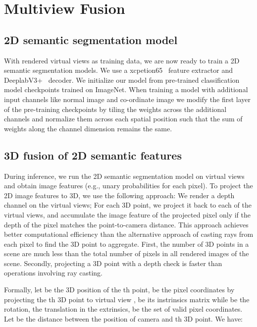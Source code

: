 \documentclass[runningheads]{llncs}
\begin{document}
\section{Multiview Fusion}\label{sec:fusion}

\subsection{2D semantic segmentation model}

With rendered virtual views as training data, we are now ready to train a 2D semantic segmentation models. We use a xcpetion65~\cite{chollet2017xception} feature extractor and DeeplabV3+~\cite{deeplabv3plus2018} decoder. We initialize our model from pre-trained classification model checkpoints trained on ImageNet. When training a model with additional input channels like normal image and co-ordinate image we modify the first layer of the pre-training checkpoints by tiling the weights across the additional channels and normalize them across each spatial position such that the sum of weights along the channel dimension remains the same.

\subsection{3D fusion of 2D semantic features}

During inference, we run the 2D semantic segmentation model on virtual views and obtain image features (e.g., unary probabilities for each pixel). To project the 2D image features to 3D, we use the following approach: We render a depth channel on the virtual views; For each 3D point, we project it back to each of the virtual views, and accumulate the image feature of the projected pixel only if the depth of the pixel matches the point-to-camera distance. This approach achieves better computational efficiency than the alternative approach of casting rays from each pixel to find the 3D point to aggregate. First, the number of 3D points in a scene are much less than the total number of pixels in all rendered images of the scene. Secondly, projecting a 3D point with a depth check is faster than operations involving ray casting.

Formally, let  be the 3D position of the th point,  be the pixel coordinates by projecting the th 3D point to virtual view ,  be its instrinsics matrix while  be the rotation,  the translation in the extrinsics,  be the set of valid pixel coordinates.  Let  be the distance between the position of camera  and th 3D point. We have:
\end{document}
